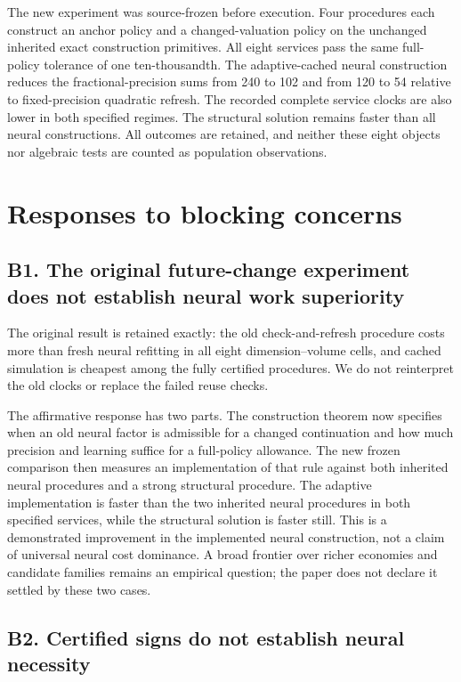 \documentclass[ecta,nameyear,draft]{econsocart}
\theoremstyle{definition}
\theoremstyle{remark}
\begin{document}
The new experiment was source-frozen before execution. Four procedures each construct an anchor policy and a changed-valuation policy on the unchanged inherited exact construction primitives. All eight services pass the same full-policy tolerance of one ten-thousandth. The adaptive-cached neural construction reduces the fractional-precision sums from 240 to 102 and from 120 to 54 relative to fixed-precision quadratic refresh. The recorded complete service clocks are also lower in both specified regimes. The structural solution remains faster than all neural constructions. All outcomes are retained, and neither these eight objects nor algebraic tests are counted as population observations.

\section*{Responses to blocking concerns}

\subsection*{B1. The original future-change experiment does not establish neural work superiority}

The original result is retained exactly: the old check-and-refresh procedure costs more than fresh neural refitting in all eight dimension--volume cells, and cached simulation is cheapest among the fully certified procedures. We do not reinterpret the old clocks or replace the failed reuse checks.

The affirmative response has two parts. The construction theorem now specifies when an old neural factor is admissible for a changed continuation and how much precision and learning suffice for a full-policy allowance. The new frozen comparison then measures an implementation of that rule against both inherited neural procedures and a strong structural procedure. The adaptive implementation is faster than the two inherited neural procedures in both specified services, while the structural solution is faster still. This is a demonstrated improvement in the implemented neural construction, not a claim of universal neural cost dominance. A broad frontier over richer economies and candidate families remains an empirical question; the paper does not declare it settled by these two cases.

\subsection*{B2. Certified signs do not establish neural necessity}
\end{document}
